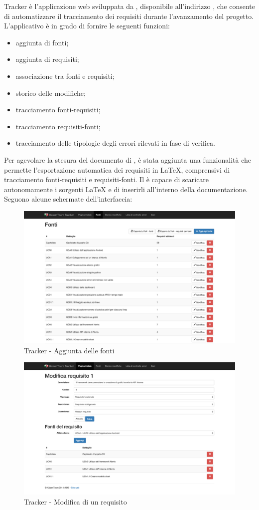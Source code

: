  \label{sec:tracker}

Tracker è l'applicazione web sviluppata da \groupname{}, disponibile all'indirizzo , che consente di automatizzare il tracciamento dei requisiti durante l’avanzamento del progetto. \\
L'applicativo è in grado di fornire le seguenti funzioni:
\begin{itemize}
	\item aggiunta di fonti;
	\item aggiunta di requisiti;
	\item associazione tra fonti e requisiti;
	\item storico delle modifiche;
	\item tracciamento fonti-requisiti;
	\item tracciamento requisiti-fonti;
	\item tracciamento delle tipologie degli errori rilevati in fase di verifica.
\end{itemize}

Per agevolare la stesura del documento di , è stata aggiunta una funzionalità che permette l’esportazione automatica dei requisiti in \LaTeX, comprensivi di tracciamento fonti-requisiti e requisiti-fonti. Il  è capace di scaricare autonomamente i sorgenti \LaTeX{} e di inserirli all’interno della documentazione. \\
Seguono alcune schermate dell’interfaccia:

\begin{figure}[H]
	\centering
	\includegraphics[width=\textwidth]{Pics/TrackerFonti}
	\caption{Tracker - Aggiunta delle fonti}
\end{figure}


\begin{figure}[H]
	\centering
	\includegraphics[width=\textwidth]{Pics/TrackerModificaRequisito}
	\caption{Tracker - Modifica di un requisito}
\end{figure}
